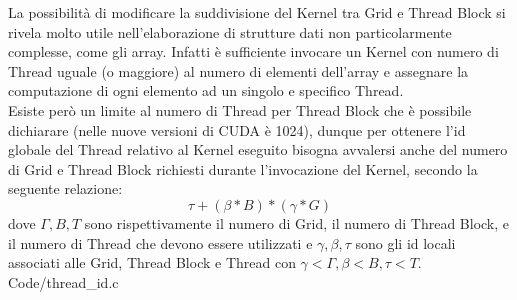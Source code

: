 La possibilità di modificare la suddivisione del Kernel tra Grid e Thread Block
si rivela molto utile nell'elaborazione di strutture dati non
particolarmente complesse, come gli array.
Infatti è sufficiente invocare un Kernel con numero di Thread
uguale (o maggiore) al numero di elementi dell'array e assegnare la
computazione di ogni elemento ad un singolo e specifico Thread.
\\
Esiste però un limite al numero di Thread per Thread Block che è possibile
dichiarare (nelle nuove versioni di CUDA è 1024), dunque per ottenere
l'id globale del Thread relativo al Kernel eseguito bisogna avvalersi anche
del numero di Grid e Thread Block richiesti durante l'invocazione del Kernel,
secondo la seguente relazione:
$$\tau + (\beta * B) * (\gamma * G)$$
dove $\Gamma, B, T$ sono rispettivamente il numero di Grid,
il numero di Thread Block, e il numero di Thread che
devono essere utilizzati e $\gamma, \beta, \tau$ sono gli id locali
associati alle Grid, Thread Block e
Thread con $\gamma < \Gamma, \beta < B, \tau < T$.
\\

    {Code/thread_id.c}

